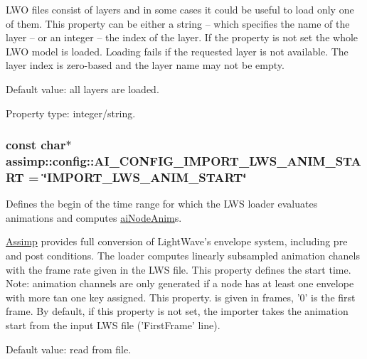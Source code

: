 L\+W\+O files consist of layers and in some cases it could be useful to load only one of them. This property can be either a string – which specifies the name of the layer – or an integer – the index of the layer. If the property is not set the whole L\+W\+O model is loaded. Loading fails if the requested layer is not available. The layer index is zero-\/based and the layer name may not be empty.

Default value\+: all layers are loaded.

Property type\+: integer/string. \hypertarget{namespaceassimp_1_1config_a5a751fc4d3f71fd8dd404f9c41848a0a}{
\subsubsection[{A\+I\+\_\+\+C\+O\+N\+F\+I\+G\+\_\+\+I\+M\+P\+O\+R\+T\+\_\+\+L\+W\+S\+\_\+\+A\+N\+I\+M\+\_\+\+S\+T\+A\+R\+T}]{\setlength{\rightskip}{0pt plus 5cm}const char$\ast$ assimp\+::config\+::\+A\+I\+\_\+\+C\+O\+N\+F\+I\+G\+\_\+\+I\+M\+P\+O\+R\+T\+\_\+\+L\+W\+S\+\_\+\+A\+N\+I\+M\+\_\+\+S\+T\+A\+R\+T = \char`\"{}I\+M\+P\+O\+R\+T\+\_\+\+L\+W\+S\+\_\+\+A\+N\+I\+M\+\_\+\+S\+T\+A\+R\+T\char`\"{}}}\label{namespaceassimp_1_1config_a5a751fc4d3f71fd8dd404f9c41848a0a}
Defines the begin of the time range for which the L\+W\+S loader evaluates animations and computes {\ttfamily \hyperlink{structai_node_anim}{ai\+Node\+Anim}}s.

\hyperlink{class_assimp}{Assimp} provides full conversion of Light\+Wave's envelope system, including pre and post conditions. The loader computes linearly subsampled animation chanels with the frame rate given in the L\+W\+S file. This property defines the start time. Note\+: animation channels are only generated if a node has at least one envelope with more tan one key assigned. This property. is given in frames, '0' is the first frame. By default, if this property is not set, the importer takes the animation start from the input L\+W\+S file ('First\+Frame' line).

Default value\+: read from file.

